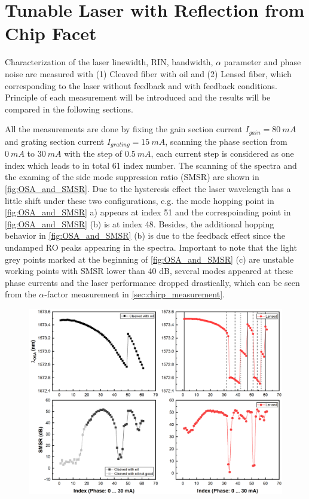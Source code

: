 \chapter{Tunable Laser with Reflection from Chip Facet}\label{ch:normal_laser}
Characterization of the laser linewidth, RIN, bandwidth, $\alpha$ parameter and phase noise are measured with (1) Cleaved fiber with oil and (2) Lensed fiber, which corresponding to the laser without feedback and with feedback conditions. Principle of each measurement will be introduced and the results will be compared in the following sections.

All the measurements are done by fixing the gain section current $I_{gain}=80 \ mA$ and grating section current $I_{grating}=15 \ mA$, scanning the phase section from $0 \ mA$ to $30 \ mA$ with the step of $0.5 \ mA$, each current step is considered as one index which leads to in total 61 index number. The scanning of the spectra and the examing of the side mode suppression ratio (SMSR) are shown in \autoref{fig:OSA_and_SMSR}. Due to the hysteresis effect the laser wavelength has a little shift under these two configurations, e.g. the mode hopping point in \autoref{fig:OSA_and_SMSR} a) appears at index 51 and the correspoinding point in \autoref{fig:OSA_and_SMSR} (b) is at index 48. Besides, the additional hopping behavior in \autoref{fig:OSA_and_SMSR} (b) is due to the feedback effect since the undamped RO peaks appearing in the spectra. Important to note that the light grey points marked at the beginning of \autoref{fig:OSA_and_SMSR} (c) are unstable working points with SMSR lower than 40 dB, several modes appeared at these phase currents and the laser performance dropped drastically, which can be seen from the $\alpha$-factor measurement in \autoref{sec:chirp_measurement}. 
\begin{figure}[ht]
    \centering
    \includegraphics[width=\linewidth]{figures/OSA_and_SMSR.png}
    \caption{}
    \label{fig:OSA_and_SMSR}
\end{figure}

